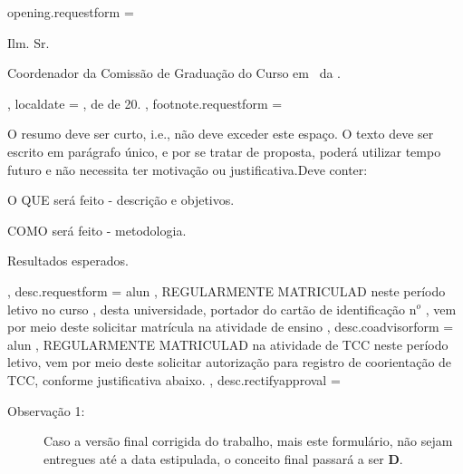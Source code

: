 {   %
  opening.requestform       = { Ilm. Sr.\par
 Coordenador da  Comissão de Graduação do Curso em \  da .   } ,
  localdate                 = {,\hspace{4mm} de \hspace{1.2cm} de 20\hspace{4mm}.} ,
 footnote.requestform       = { O resumo deve ser curto, i.e., não deve exceder este espaço. O texto deve ser escrito em parágrafo único, 
                                e por se tratar de proposta, poderá utilizar  tempo futuro e não necessita ter motivação ou justificativa.\break  Deve conter:
                                \begin{enumerate*}[alpha)] 
                                	\item O QUE será feito - descrição e objetivos.
                                   \item COMO será feito - metodologia.
                                	\item Resultados esperados.
                                \end{enumerate*}%
                                } ,   %
  desc.requestform          = {  alun , 
                              REGULARMENTE MATRICULAD neste período letivo no curso \emph{}, desta universidade, 
                              portador do cartão de identificação n$^o$ , 
                              vem por meio deste solicitar matrícula na atividade de ensino} ,
  desc.coadvisorform            = { alun , 
                              REGULARMENTE MATRICULAD na atividade de TCC neste período letivo, 
                              vem por meio deste solicitar autorização para registro de coorientação de TCC, conforme justificativa abaixo.} ,
  desc.rectifyapproval      = { \begin{description}
                              \item[Observação 1:] Caso a versão final corrigida do trabalho, mais este formulário, não sejam entregues até a data estipulada, o conceito final passará a ser {\bf D}.

\end{description}}}
